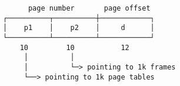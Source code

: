 \documentclass[varwidth]{standalone}
\begin{document}
\begin{verbatim}
      page number       page offset
┌──────────┬──────────┼────────────┐
│    p1    │    p2    │     d      │
└──────────┴──────────┴────────────┘
    10         10           12
     │          │
     │          └─> pointing to 1k frames
     └──> pointing to 1k page tables
\end{verbatim}
\end{document}
